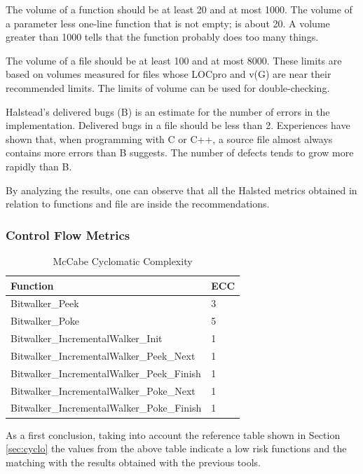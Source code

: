 The volume of a function should be at least 20 and at most 1000. The volume of a parameter less one-line function that is not empty; is about 20. A volume greater than 1000 tells that the function probably does too many things.

The volume of a file should be at least 100 and at most 8000. These limits are based on volumes measured for files whose LOCpro and v(G) are near their recommended limits. The limits of volume can be used for double-checking.

Halstead's delivered bugs (B) is an estimate for the number of errors in the implementation.
Delivered bugs in a file should be less than 2. 
Experiences have shown that, when programming with C or C++, a source file almost always contains more errors than B suggests. The number of defects tends to grow more rapidly than B.

By analyzing the results, one can observe that all the Halsted metrics obtained in relation to functions and file are inside the recommendations.


\subsubsection{Control Flow Metrics}
\begin{longtable}{||p{}|p{}||}
  \caption{McCabe Cyclomatic Complexity}\\
    \hline\hline
    \textbf{Function} &\textbf{ECC}\\
    \hline\hline
    \endhead
    \hline\hline
    \endfoot
    Bitwalker\_Peek & 3  
    \\
    \hline
    Bitwalker\_Poke & 5  
    \\
    \hline
    Bitwalker\_IncrementalWalker\_Init & 1
    \\
    \hline
    Bitwalker\_IncrementalWalker\_Peek\_Next & 1  
    \\
    \hline
    Bitwalker\_IncrementalWalker\_Peek\_Finish & 1  
    \\
    \hline
    Bitwalker\_IncrementalWalker\_Poke\_Next & 1  
    \\
    \hline
    Bitwalker\_IncrementalWalker\_Poke\_Finish & 1  
    \\
    \hline
   \end{longtable}

As a first conclusion, taking into account the reference table shown in Section \ref{sec:cyclo} the values from the above table indicate a low risk functions and the matching with the results obtained with the previous tools.

